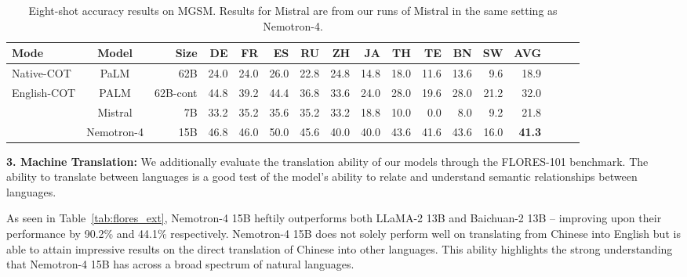\documentclass[11pt]{article}
\newcommand{\ours}{Nemotron-4}
\begin{document}
\begin{table}[H]
\centering
\begin{adjustbox}{max width=\textwidth, scale=1.0}
\begin{tabular}{lcrrrrrrrrrrrrrrr}
\toprule
Mode & Model & Size & DE & FR & ES & RU & ZH & JA & TH & TE & BN & SW & AVG  \\
\midrule
 \multirow{1}{*}{Native-COT}  & \multirow{1}{*}{PaLM} 
 &   62B 	&24.0  &	24.0 &	26.0 &	22.8 &	24.8	& 14.8 & 18.0 & 11.6 &	13.6 & 9.6&	18.9	\\
\midrule
\multirow{3}{*}{English-COT} & \multirow{1}{*}{PALM} & 62B-cont & 44.8 & 39.2 & 44.4 & 36.8 & 33.6 & 24.0 & 28.0 & 19.6 & 28.0 & 21.2 & 32.0 \\
& \multirow{1}{*}{Mistral} & 7B & 33.2 & 35.2 & 35.6 & 35.2 & 33.2 & 18.8 & 10.0 & 0.0 & 8.0 & 9.2 & 21.8 \\
& \multirow{1}{*}{\ours{}} & 15B & 46.8 & 46.0 & 50.0&45.6&40.0&40.0&43.6&41.6&43.6&16.0 & \textbf{41.3} \\
\bottomrule
\end{tabular}
\end{adjustbox}
\caption{\label{tab:mgsm_all} Eight-shot accuracy results on MGSM. Results for Mistral are from our runs of Mistral in the same setting as \ours{}. }
\end{table}

\textbf{3. Machine Translation:} We additionally evaluate the translation ability of our models through the FLORES-101 \citep{goyal2021} benchmark. The ability to translate between languages is a good test of the model's ability to relate and understand semantic relationships between languages.

As seen in Table~\ref{tab:flores_ext}, \ours{} 15B heftily outperforms both LLaMA-2 13B and Baichuan-2 13B -- improving upon their performance by 90.2\% and 44.1\% respectively. \ours{} 15B does not solely perform well on translating from Chinese into English but is able to attain impressive results on the direct translation of Chinese into other languages. This ability highlights the strong understanding that \ours{} 15B has across a broad spectrum of natural languages.
\end{document}
